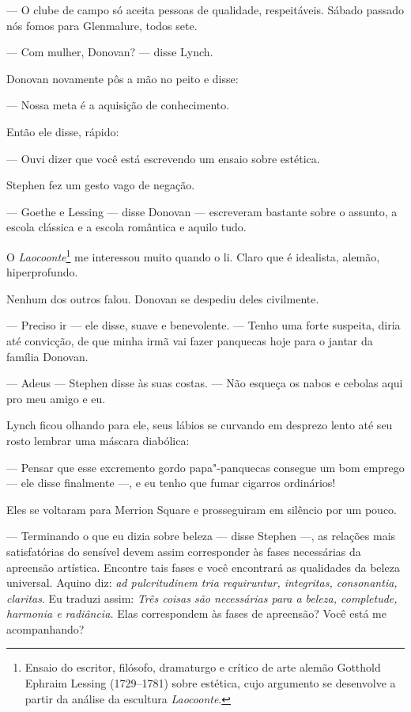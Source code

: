  --- O clube de campo só aceita pessoas de qualidade, respeitáveis. Sábado
passado nós fomos para Glenmalure, todos sete.

 --- Com mulher, Donovan? --- disse Lynch.

Donovan novamente pôs a mão no peito e disse:

 --- Nossa meta é a aquisição de conhecimento.

Então ele disse, rápido:

 --- Ouvi dizer que você está escrevendo um ensaio sobre estética.

Stephen fez um gesto vago de negação.

 --- Goethe e Lessing --- disse Donovan --- escreveram bastante sobre o assunto, 
a escola clássica e a escola romântica e aquilo tudo.

O \textit{Laocoonte}\footnote{ Ensaio do escritor, filósofo, dramaturgo e crítico de arte 
alemão Gotthold Ephraim Lessing (1729--1781)
sobre estética, cujo argumento se desenvolve a partir da análise da
escultura \textit{Laocoonte}.} me interessou muito quando o li. Claro que é
idealista, alemão, hiperprofundo.

Nenhum dos outros falou. Donovan se despediu deles civilmente.

 --- Preciso ir --- ele disse, suave e benevolente. --- Tenho uma forte suspeita,
diria até convicção, de que minha irmã vai fazer panquecas hoje para o
jantar da família Donovan.

 --- Adeus --- Stephen disse às suas costas. --- Não esqueça os nabos e cebolas
aqui pro meu amigo e eu.

Lynch ficou olhando para ele, seus lábios se curvando em desprezo lento
até seu rosto lembrar uma máscara diabólica:

 --- Pensar que esse excremento gordo papa"-panquecas consegue um bom
emprego --- ele disse finalmente ---, e eu tenho que fumar cigarros
ordinários!

Eles se voltaram para Merrion Square e prosseguiram em silêncio por um
pouco.

 --- Terminando o que eu dizia sobre beleza --- disse Stephen ---, as relações
mais satisfatórias do sensível devem assim corresponder às fases
necessárias da apreensão artística. Encontre tais fases e você
encontrará as qualidades da beleza universal. Aquino diz: \textit{ad
pulcritudinem tria requiruntur, integritas, consonantia, claritas}. Eu
traduzi assim: \textit{Três coisas são necessárias para a beleza,
completude, harmonia e radiância.} Elas correspondem às fases de
apreensão? Você está me acompanhando?

